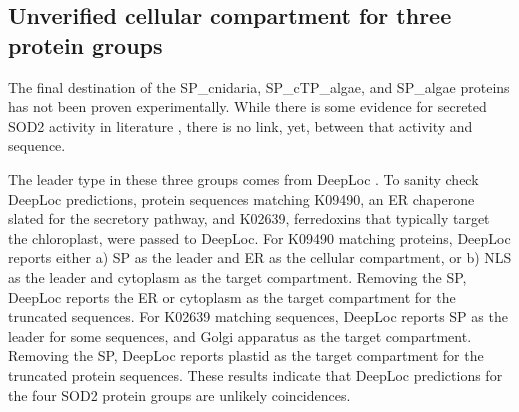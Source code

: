 \subsection*{Unverified cellular compartment for three protein groups}

The final destination of the SP\_cnidaria, SP\_cTP\_algae, and SP\_algae
proteins has not been proven experimentally. While there is some evidence for
secreted SOD2 activity in literature \cite{saragosti2010plosone}
\cite{dash2007gene}, there is no link, yet, between that activity and sequence.

The leader type in these three groups comes from DeepLoc \cite{deeploc21}. To
sanity check DeepLoc predictions, protein sequences matching K09490, an ER
chaperone slated for the secretory pathway, and K02639, ferredoxins that
typically target the chloroplast, were passed to DeepLoc. For K09490 matching
proteins, DeepLoc reports either a) SP as the leader and ER as the cellular
compartment, or b) NLS as the leader and cytoplasm as the target compartment.
Removing the SP, DeepLoc reports the ER or cytoplasm as the target compartment
for the truncated sequences. For K02639 matching sequences, DeepLoc reports SP
as the leader for some sequences, and Golgi apparatus as the target
compartment. Removing the SP, DeepLoc reports plastid as the target compartment
for the truncated protein sequences. These results indicate that DeepLoc
predictions for the four SOD2 protein groups are unlikely coincidences.
